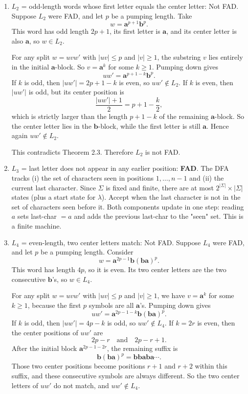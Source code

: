\begin{enumerate}[{2.}1.]
\begin{enumerate}
\item $L_2$ = odd-length words whose first letter equals the center letter: Not FAD.
Suppose $L_2$ were FAD, and let $p$ be a pumping length.
Take
\[
w=\mathbf{a}^{p+1}\mathbf{b}^p.
\]
This word has odd length $2p+1$, its first letter is $\mathbf a$, and its center letter
is also $\mathbf a$, so $w\in L_2$.

For any split $w=uvw'$ with $|uv|\le p$ and $|v|\ge1$, the substring $v$ lies entirely
in the initial $\mathbf a$-block. So $v=\mathbf a^k$ for some $k\ge1$.
Pumping down gives
\[
uw'=\mathbf{a}^{p+1-k}\mathbf{b}^p.
\]
If $k$ is odd, then $|uw'|=2p+1-k$ is even, so $uw'\notin L_2$.
If $k$ is even, then $|uw'|$ is odd, but its center position is
\[
\frac{|uw'|+1}{2}=p+1-\frac{k}{2},
\]
which is strictly larger than the length $p+1-k$ of the remaining $\mathbf a$-block.
So the center letter lies in the $\mathbf b$-block, while the first letter is still $\mathbf a$.
Hence again $uw'\notin L_2$.

This contradicts Theorem 2.3. Therefore $L_2$ is not FAD.

\item $L_3$ = last letter does not appear in any earlier position: \textbf{FAD}. The DFA tracks (i) the set of characters seen in positions $1,\ldots,n-1$ and (ii) the current last character. Since $\Sigma$ is fixed and finite, there are at most $2^{|\Sigma|}\times|\Sigma|$ states (plus a start state for $\lambda$). Accept when the last character is not in the set of characters seen before it. Both components update in one step: reading $a$ sets last-char $= a$ and adds the previous last-char to the "seen" set. This is a finite machine.

\item $L_4$ = even-length, two center letters match: Not FAD.
Suppose $L_4$ were FAD, and let $p$ be a pumping length.
Consider
\[
w=\mathbf{a}^{2p-1}\mathbf{b}(\mathbf{ba})^p.
\]
This word has length $4p$, so it is even. Its two center letters are the two consecutive
$\mathbf b$'s, so $w\in L_4$.

For any split $w=uvw'$ with $|uv|\le p$ and $|v|\ge1$, we have $v=\mathbf a^k$ for some
$k\ge1$, because the first $p$ symbols are all $\mathbf a$'s.
Pumping down gives
\[
uw'=\mathbf{a}^{2p-1-k}\mathbf{b}(\mathbf{ba})^p.
\]
If $k$ is odd, then $|uw'|=4p-k$ is odd, so $uw'\notin L_4$.
If $k=2r$ is even, then the center positions of $uw'$ are
\[
2p-r\quad\text{and}\quad 2p-r+1.
\]
After the initial block $\mathbf a^{2p-1-2r}$, the remaining suffix is
\[
\mathbf{b}(\mathbf{ba})^p=\mathbf{b}\mathbf{b}\mathbf{a}\mathbf{b}\mathbf{a}\cdots.
\]
Those two center positions become positions $r+1$ and $r+2$ within this suffix, and
these consecutive symbols are always different. So the two center letters of $uw'$ do
not match, and $uw'\notin L_4$.


\end{enumerate}
\end{enumerate}
